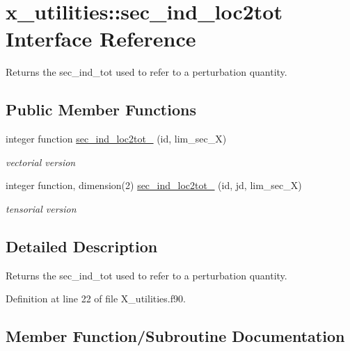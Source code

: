 \hypertarget{interfacex__utilities_1_1sec__ind__loc2tot}{}\section{x\+\_\+utilities\+:\+:sec\+\_\+ind\+\_\+loc2tot Interface Reference}
\label{interfacex__utilities_1_1sec__ind__loc2tot}


Returns the {\ttfamily sec\+\_\+ind\+\_\+tot} used to refer to a perturbation quantity.  


\subsection*{Public Member Functions}
\begin{DoxyCompactItemize}
\item 
integer function \hyperlink{interfacex__utilities_1_1sec__ind__loc2tot_a035190810f1109eb84c56e6bb64ffd53}{sec\+\_\+ind\+\_\+loc2tot\+\_} (id, lim\+\_\+sec\+\_\+X)
\begin{DoxyCompactList}\small\item\em vectorial version \end{DoxyCompactList}\item 
integer function, dimension(2) \hyperlink{interfacex__utilities_1_1sec__ind__loc2tot_aa78e93f7f701311347e9df68c0d12c71}{sec\+\_\+ind\+\_\+loc2tot\+\_} (id, jd, lim\+\_\+sec\+\_\+X)
\begin{DoxyCompactList}\small\item\em tensorial version \end{DoxyCompactList}\end{DoxyCompactItemize}


\subsection{Detailed Description}
Returns the {\ttfamily sec\+\_\+ind\+\_\+tot} used to refer to a perturbation quantity. 

Definition at line 22 of file X\+\_\+utilities.\+f90.



\subsection{Member Function/\+Subroutine Documentation}
\mbox{\label{interfacex__utilities_1_1sec__ind__loc2tot_a035190810f1109eb84c56e6bb64ffd53}} 
